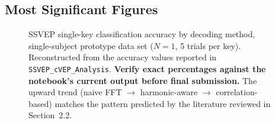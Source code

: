 \documentclass[11pt]{article}
\begin{document}
\subsection{Most Significant Figures}

\begin{figure}[htbp]
\centering
{}
\caption{SSVEP single-key classification accuracy by decoding method, single-subject prototype data set ($N=1$, 5 trials per key). Reconstructed from the accuracy values reported in \texttt{SSVEP\_cVEP\_Analysis}. \textbf{Verify exact percentages against the notebook's current output before final submission.} The upward trend (naive FFT $\rightarrow$ harmonic-aware $\rightarrow$ correlation-based) matches the pattern predicted by the literature reviewed in Section~2.2.}
\label{fig:ssvep-progression}
\end{figure}
\end{document}
